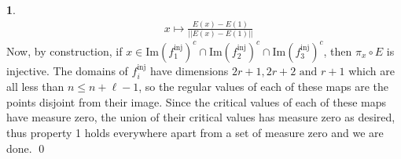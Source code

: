 \documentclass[10.5pt]{article}
\theoremstyle{definition}
\newtheorem{pb}{}
\newcommand{\norm}[1]{\lvert\lvert#1\rvert\rvert}
\newcommand{\tand}{\text{ and }}
\begin{document}
\begin{pb}
\begin{align*}
            &x \mapsto \frac{E(x) - E(1)}{\norm{E(x) - E(1)}}
        \end{align*}
        Now, by construction, if \(x \in \text{Im}(f_1^\text{inj})^c \cap \text{Im}(f_2^\text{inj})^c \cap \text{Im}(f_3^\text{inj})^c\), then \(\pi_x\circ E\) is injective. The domains of \(f_i^\text{inj}\) have dimensions \(2r+1,2r+2 \tand r+1\) which are all less than \(n \leq n + \ell - 1\), so the regular values of each of these maps are the points disjoint from their image. Since the critical values of each of these maps have measure zero, the union of their critical values has measure zero as desired, thus property 1 holds everywhere apart from a set of measure zero and we are done. \qed
    \end{pb}
\end{document}
